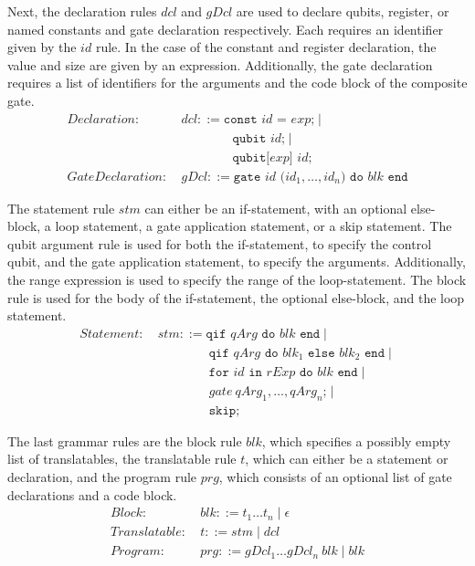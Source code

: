Next, the declaration rules $dcl$ and $gDcl$ are used to declare qubits, register, or named constants and gate declaration respectively. Each requires an identifier given by the $id$ rule. In the case of the constant and register declaration, the value and size are given by an expression. Additionally, the gate declaration requires a list of identifiers for the arguments and the code block of the composite gate.
\begin{align*}
    Declaration: \ & dcl ::= \texttt{const } id \texttt{ = } exp \texttt{;} \mid \\
                 & \quad \quad \quad \quad \texttt{qubit } id \texttt{;} \mid \\
                 & \quad \quad \quad \quad \texttt{qubit[} exp \texttt{] } id \texttt{;}\\
    GateDeclaration: \ & gDcl::= \texttt{gate } id \texttt{ (}id_1, \dots, id_n\texttt{) do } blk \texttt{ end}
\end{align*}

The statement rule $stm$ can either be an if-statement, with an optional else-block, a loop statement, a gate application statement, or a skip statement. The qubit argument rule is used for both the if-statement, to specify the control qubit, and the gate application statement, to specify the arguments. Additionally, the range expression is used to specify the range of the loop-statement. The block rule is used for the body of the if-statement, the optional else-block, and the loop statement.
\begin{align*}
    Statement: \ & stm ::= \texttt{qif } qArg \texttt{ do }  blk \texttt{ end} \mid\\
                 & \quad \quad \quad \quad \texttt{qif } qArg \texttt{ do }  blk_1 \texttt{ else } blk_2 \texttt{ end} \mid\\
                 & \quad \quad \quad \quad \texttt{for } id \texttt{ in } rExp \texttt{ do } blk \texttt{ end} \mid \\
                 & \quad \quad \quad \quad gate \ qArg_1, \dots, qArg_n \texttt{;} \mid \\
                 & \quad \quad \quad \quad \texttt{skip;}
\end{align*}

The last grammar rules are the block rule $blk$, which specifies a possibly empty list of translatables, the translatable rule $t$, which can either be a statement or declaration, and the program rule $prg$, which consists of an optional list of gate declarations and a code block. 
\begin{align*}
    Block: \ & blk::= t_1 \dots t_n \mid \epsilon\\
    Translatable : \ & t::= stm \mid dcl\\
    Program: \ & prg ::= gDcl_1 \dots gDcl_n \ blk \mid blk 
\end{align*}

